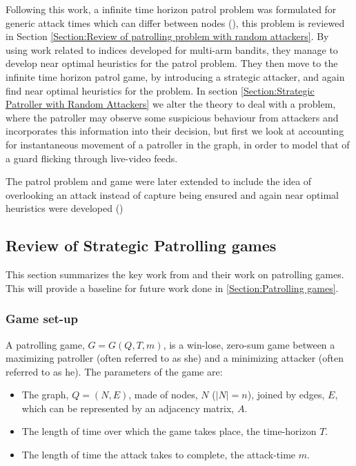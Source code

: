 \documentclass[a4paper,10pt]{article}
\theoremstyle{definition}
\theoremstyle{definition}
\theoremstyle{remark}
\theoremstyle{definition}
\begin{document}
Following this work, a infinite time horizon patrol problem was formulated for generic attack times which can differ between nodes (\citep{Lin2013}), this problem is reviewed in Section \ref{Section:Review of patrolling problem with random attackers}. By using work related to indices developed for multi-arm bandits, they manage to develop near optimal heuristics for the patrol problem. They then move to the infinite time horizon patrol game, by introducing a strategic attacker, and again find near optimal heuristics for the problem. In section \ref{Section:Strategic Patroller with Random Attackers} we alter the theory to deal with a problem, where the patroller may observe some suspicious behaviour from attackers and incorporates this information into their decision, but first we look at accounting for instantaneous movement of a patroller in the graph, in order to model that of a guard flicking through live-video feeds.

The patrol problem and game were later extended to include the idea of overlooking an attack instead of capture being ensured and again near optimal heuristics were developed (\cite{Lin2014})

\subsection{Review of Strategic Patrolling games}
\label{Section:Review of Strategic Patrolling games}
This section summarizes the key work from \cite{Alpern2011} and their work on patrolling games. This will provide a baseline for future work done in \ref{Section:Patrolling games}.

\subsubsection{Game set-up}
A patrolling game, $G=G(Q,T,m)$, is a win-lose, zero-sum game between a maximizing patroller (often referred to as she) and a minimizing attacker (often referred to as he). The parameters of the game are:
\begin{itemize}
\item The graph, $Q=(N,E)$,   made of nodes, $N$ ($|N|=n$), joined by edges, $E$, which can be represented by an adjacency matrix, $A$.
\item The length of time over which the game takes place, the time-horizon $T$.
\item The length of time the attack takes to complete, the attack-time $m$.
\end{itemize}
\end{document}
